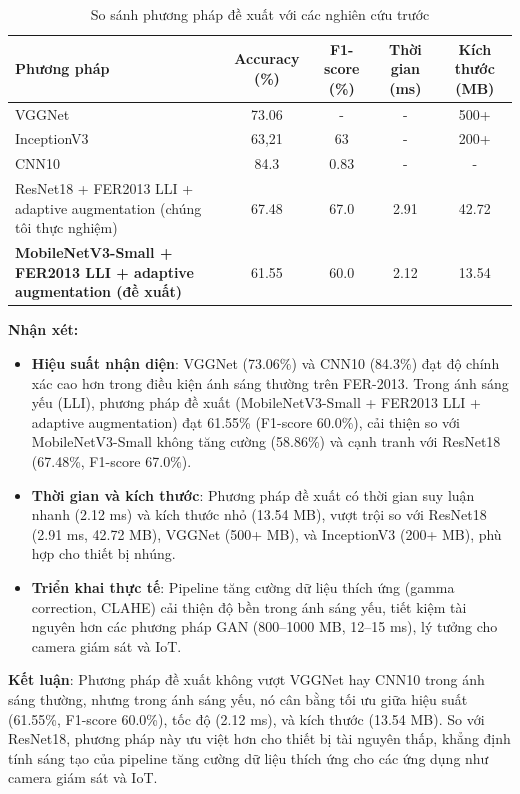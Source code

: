 \begin{table}[H]
\centering
\caption{So sánh phương pháp đề xuất với các nghiên cứu trước}
\label{tab:compare_sota}
\begin{tabular}{@{}>{\raggedright\arraybackslash}p{5cm}cccc@{}}
\toprule
\textbf{Phương pháp} & \textbf{Accuracy (\%)} & \textbf{F1-score (\%)} & \textbf{Thời gian (ms)} & \textbf{Kích thước (MB)} \\ \midrule
VGGNet~\cite{khaireddin2021} & 73.06 & - & - & 500+ \\
InceptionV3~\cite{dada2023} & 63,21 & 63 & - & 200+ \\
CNN10~\cite{dada2023} & 84.3 & 0.83 & - & - \\
ResNet18 + FER2013 LLI + adaptive augmentation (chúng tôi thực nghiệm) & 67.48 & 67.0 & 2.91 & 42.72 \\
\textbf{MobileNetV3-Small + FER2013 LLI + adaptive augmentation (đề xuất)} & 61.55 & 60.0 & 2.12 & 13.54 \\ \bottomrule
\end{tabular}
\end{table}

\textbf{Nhận xét:}

\begin{itemize}
    \item \textbf{Hiệu suất nhận diện}: VGGNet (73.06\%) và CNN10 (84.3\%) đạt độ chính xác cao hơn trong điều kiện ánh sáng thường trên FER-2013. Trong ánh sáng yếu (LLI), phương pháp đề xuất (MobileNetV3-Small + FER2013 LLI + adaptive augmentation) đạt 61.55\% (F1-score 60.0\%), cải thiện so với MobileNetV3-Small không tăng cường (58.86\%) và cạnh tranh với ResNet18 (67.48\%, F1-score 67.0\%).
    \item \textbf{Thời gian và kích thước}: Phương pháp đề xuất có thời gian suy luận nhanh (2.12 ms) và kích thước nhỏ (13.54 MB), vượt trội so với ResNet18 (2.91 ms, 42.72 MB), VGGNet (500+ MB), và InceptionV3 (200+ MB), phù hợp cho thiết bị nhúng.
    \item \textbf{Triển khai thực tế}: Pipeline tăng cường dữ liệu thích ứng (gamma correction, CLAHE) cải thiện độ bền trong ánh sáng yếu, tiết kiệm tài nguyên hơn các phương pháp GAN (800–1000 MB, 12–15 ms), lý tưởng cho camera giám sát và IoT.
\end{itemize}

\textbf{Kết luận}: Phương pháp đề xuất không vượt VGGNet hay CNN10 trong ánh sáng thường, nhưng trong ánh sáng yếu, nó cân bằng tối ưu giữa hiệu suất (61.55\%, F1-score 60.0\%), tốc độ (2.12 ms), và kích thước (13.54 MB). So với ResNet18, phương pháp này ưu việt hơn cho thiết bị tài nguyên thấp, khẳng định tính sáng tạo của pipeline tăng cường dữ liệu thích ứng cho các ứng dụng như camera giám sát và IoT.

